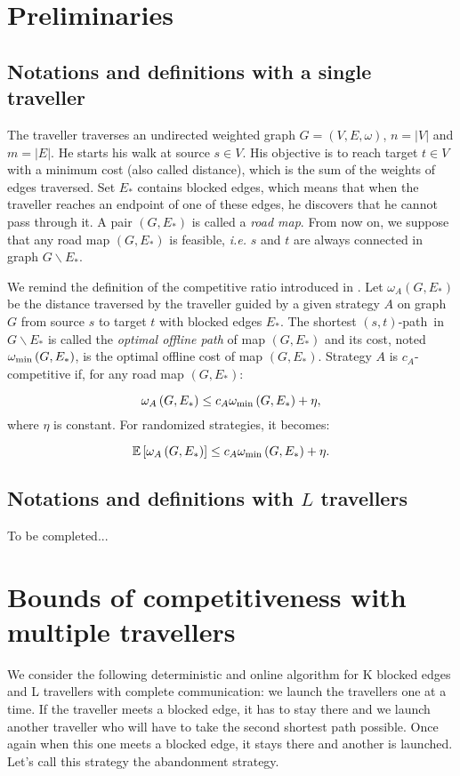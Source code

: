 \documentclass[a4paper, 10pt]{article}
\newcommand{\card}[1]{\left| #1 \right|}
\newcommand{\stpath}{$(s,t)$-path}
\newcommand{\omegamin}{\omega_{\mbox{\scriptsize{min}}}}
\begin{document}
\section{Preliminaries}

\subsection{Notations and definitions with a single traveller} 
The traveller traverses an undirected weighted graph $G=\left(V,E,\omega\right)$, $n = \card{V}$ and $m = \card{E}$. He starts his walk at source $s \in V$. His objective is to reach target $t\in V$ with a minimum cost (also called distance), which is the sum of the weights of edges traversed. Set $E_*$ contains blocked edges, which means that when the traveller reaches an endpoint of one of these edges, he discovers that he cannot pass through it. A pair $\left(G,E_*\right)$ is called a \textit{road map}. From now on, we suppose that any road map $\left(G,E_*\right)$ is feasible, {\em i.e.} $s$ and $t$ are always connected in graph $G\backslash E_*$.

We remind the definition of the competitive ratio introduced in \cite{BoEl98}. Let $\omega_A\left(G,E_*\right)$ be the distance traversed by the traveller guided by a given strategy $A$ on graph $G$ from source $s$ to target $t$ with blocked edges $E_*$. The shortest \stpath ~in $G\backslash E_*$ is called the \textit{optimal offline path} of map $\left(G,E_*\right)$ and its cost, noted $\omegamin\left(G,E_*\right)$, is the optimal offline cost of map $\left(G,E_*\right)$. Strategy $A$ is $c_A$-competitive if, for any road map $\left(G,E_*\right)$:

\[
\omega_A\left(G,E_*\right) \leq c_A\omegamin\left(G,E_*\right) + \eta,
\]
where $\eta$ is constant. For randomized strategies, it becomes:

\[
\mathbb{E}\left[\omega_A\left(G,E_*\right)\right] \leq c_A\omegamin\left(G,E_*\right) + \eta.
\]

\subsection{Notations and definitions with $L$ travellers}

To be completed...

\section{Bounds of competitiveness with multiple travellers}
We consider the following deterministic and online algorithm for K blocked edges and L travellers with complete communication: we launch the travellers one at a time. If the traveller meets a blocked edge, it has to stay there and we launch another traveller who will have to take the second shortest path possible. Once again when this one meets a blocked edge, it stays there and another is launched. Let's call this strategy the abandonment strategy.
\end{document}
